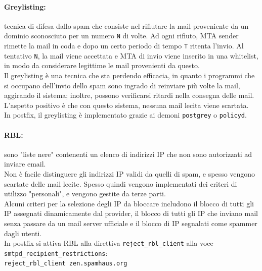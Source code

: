 \documentclass[a4paper]{report}
\newcommand\tab[1][1cm]{\hspace*{#1}}
\begin{document}
\paragraph{Greylisting:} tecnica di difesa dallo spam che consiste nel rifiutare la mail proveniente da un dominio sconosciuto per un numero \texttt{N} di volte. Ad ogni rifiuto, MTA sender rimette la mail in coda e dopo un certo periodo di tempo \texttt{T} ritenta l'invio. Al tentativo \texttt{N}, la mail viene accettata e MTA di invio viene inserito in una whitelist, in modo da considerare legittime le mail provenienti da questo.\\
Il greylisting è una tecnica che sta perdendo efficacia, in quanto i programmi che si occupano dell'invio dello spam sono ingrado di reinviare più volte la mail, aggirando il sistema; inoltre, possono verificarsi ritardi nella consegna delle mail. L'aspetto positivo è che con questo sistema, nessuna mail lecita viene scartata.\\
In postfix, il greylisting è implementato grazie ai demoni \texttt{postgrey} o \texttt{policyd}.
\paragraph{RBL:} sono "liste nere" contenenti un elenco di indirizzi IP che non sono autorizzati ad inviare email.\\
Non è facile distinguere gli indirizzi IP validi da quelli di spam, e spesso vengono scartate delle mail lecite. Spesso quindi vengono implementati dei criteri di utilizzo "personali", e vengono gestite da terze parti.\\
Alcuni criteri per la selezione degli IP da bloccare includono il blocco di tutti gli IP assegnati dinamicamente dal provider, il blocco di tutti gli IP che inviano mail senza passare da un mail server ufficiale e il blocco di IP segnalati come spammer dagli utenti.\\
In postfix si attiva RBL alla direttiva \texttt{reject\_rbl\_client} alla voce \texttt{smtpd\_recipient\_restrictions}:\\
\tab\texttt{reject\_rbl\_client zen.spamhaus.org}
\end{document}
